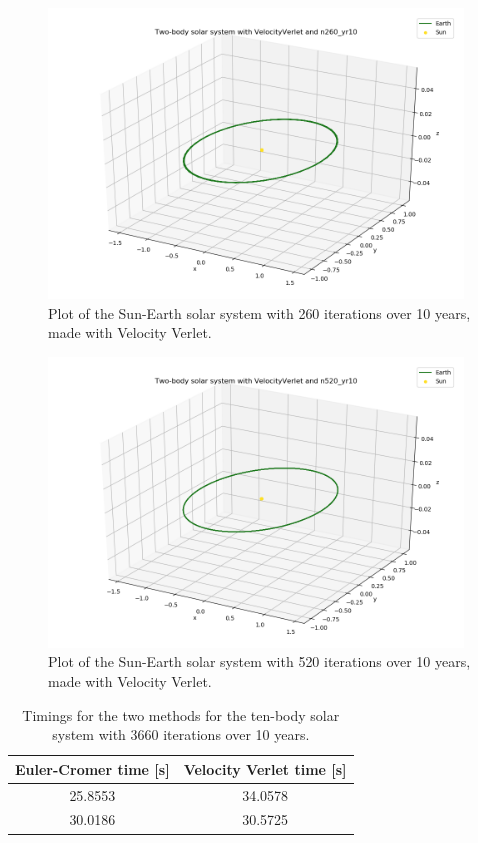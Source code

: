 \documentclass{article}
\begin{document}
    \begin{figure}[H]
        \centering
        \includegraphics[width = 11cm]{img/plot3D_S_E_V_n260_yr10.png}
        \caption{Plot of the Sun-Earth solar system with 260 iterations over 10 years, made with Velocity Verlet. }
        \label{fig:plot3D_S_E_V_n260_yr10}
    \end{figure}

    \begin{figure}[H]
        \centering
        \includegraphics[width = 11cm]{img/plot3D_S_E_V_n520_yr10.png}
        \caption{Plot of the Sun-Earth solar system with 520 iterations over 10 years, made with Velocity Verlet. }
        \label{fig:plot3D_S_E_V_n520_yr10}
    \end{figure}

    \begin{table}[H]
        \centering
        \caption{Timings for the two methods for the ten-body solar system with 3660 iterations over 10 years.}
        \vspace{2mm}
        \label{tab:timings}
        \begin{tabular}{|c|c|}
            \hline
            Euler-Cromer time [s] & Velocity Verlet time [s] \\
            \hline \hline
            25.8553 & 34.0578 \\
            30.0186 & 30.5725 \\
            \hline
        \end{tabular} \\
        \hspace{0pt}\\
    \end{table}
\end{document}
